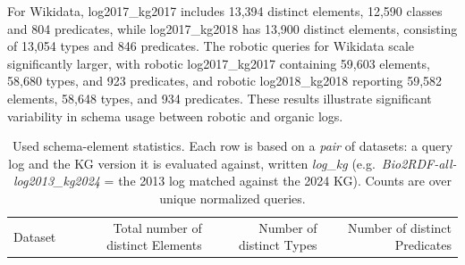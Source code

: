\documentclass[sw]{iosart2x}
\providecommand{\DIFaddbeginFL}{} %
\providecommand{\DIFdelbeginFL}{} %
\providecommand{\DIFdelendFL}{} %
\providecommand{\DIFscaledelfig}{0.5}
\newlength{\DIFdelgraphicswidth} %
\newlength{\DIFdelgraphicsheight} %
\providecommand{\DIFaddincludegraphics}[2][]{{\color{blue}\fbox{\DIFOincludegraphics[#1]{#2}}}} %
\providecommand{\DIFdelincludegraphics}[2][]{%
\sbox{\DIFdelgraphicsbox}{\DIFOincludegraphics[#1]{#2}}%
\settoboxwidth{\DIFdelgraphicswidth}{\DIFdelgraphicsbox} %
\settoboxtotalheight{\DIFdelgraphicsheight}{\DIFdelgraphicsbox} %
\scalebox{\DIFscaledelfig}{%
\parbox[b]{\DIFdelgraphicswidth}{\usebox{\DIFdelgraphicsbox}\\[-\baselineskip] \rule{\DIFdelgraphicswidth}{0em}}\llap{\resizebox{\DIFdelgraphicswidth}{\DIFdelgraphicsheight}{%
\setlength{\unitlength}{\DIFdelgraphicswidth}%
\begin{picture}(1,1)%
\thicklines\linethickness{2pt} %
{\color[rgb]{1,0,0}\put(0,0){\framebox(1,1){}}}%
{\color[rgb]{1,0,0}\put(0,0){\line( 1,1){1}}}%
{\color[rgb]{1,0,0}\put(0,1){\line(1,-1){1}}}%
\end{picture}%
}\hspace*{3pt}}} %
} %
\DeclareRobustCommand{\DIFaddbeginFL}{\DIFOaddbeginFL \let\includegraphics\DIFaddincludegraphics} %
\DeclareRobustCommand{\DIFdelbeginFL}{\DIFOdelbeginFL \let\includegraphics\DIFdelincludegraphics} %
\DeclareRobustCommand{\DIFdelendFL}{\DIFOaddendFL \let\includegraphics\DIFOincludegraphics} %
\begin{document}
For Wikidata, log2017\_kg2017 includes 13,394 distinct elements, 12,590 classes and 804 predicates, while log2017\_kg2018 has 13,900 distinct elements, consisting of 13,054 types and 846 predicates. The robotic queries for Wikidata scale significantly larger, with robotic log2017\_kg2017 containing 59,603 elements, 58,680 types, and 923 predicates, and robotic log2018\_kg2018 reporting 59,582 elements, 58,648 types, and 934 predicates. These results illustrate significant variability in schema usage between robotic and organic logs.
\begin{table}[ht]
\centering
\caption{Used schema-element statistics. Each row is based on a \emph{pair} of datasets: a query log and the KG version it is evaluated against, written \emph{log}\_\emph{kg} (e.g.\ \emph{Bio2RDF-all-log2013\_kg2024} = the 2013 log matched against the 2024 KG). Counts are over unique normalized queries.}
\label{tab:4}
\DIFdelbeginFL %
\DIFdelendFL \DIFaddbeginFL \begin{tabular}{l|r|r|r}
\hline
Dataset & Total number of distinct Elements & Number of distinct Types & Number of distinct Predicates \\

\end{tabular}
\end{table}
\end{document}
